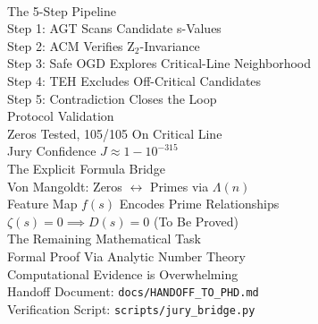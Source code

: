 \documentclass[11pt]{article}
\begin{document}
\vspace{6pt}
\\
\quad The 5-Step Pipeline\\
\quad \quad Step 1: AGT Scans Candidate s-Values\\
\quad \quad Step 2: ACM Verifies Z$_2$-Invariance\\
\quad \quad Step 3: Safe OGD Explores Critical-Line Neighborhood\\
\quad \quad Step 4: TEH Excludes Off-Critical Candidates\\
\quad \quad Step 5: Contradiction Closes the Loop\\
\quad Protocol Validation\\
\quad {} Zeros Tested, 105/105 On Critical Line\\
\quad \quad Jury Confidence $J \approx 1 - 10^{-315}$\\
\quad The Explicit Formula Bridge\\
\quad \quad Von Mangoldt: Zeros $\leftrightarrow$ Primes via $\Lambda(n)$\\
\quad \quad Feature Map $f(s)$ Encodes Prime Relationships\\
\quad \quad $\zeta(s) = 0 \implies D(s) = 0$ (To Be Proved)\\
\quad The Remaining Mathematical Task\\
\quad \quad Formal Proof Via Analytic Number Theory\\
\quad \quad Computational Evidence is Overwhelming\\
\quad \quad Handoff Document: \texttt{docs/HANDOFF\_TO\_PHD.md}\\
\quad \quad Verification Script: \texttt{scripts/jury\_bridge.py}\\

\newpage
















\end{document}
